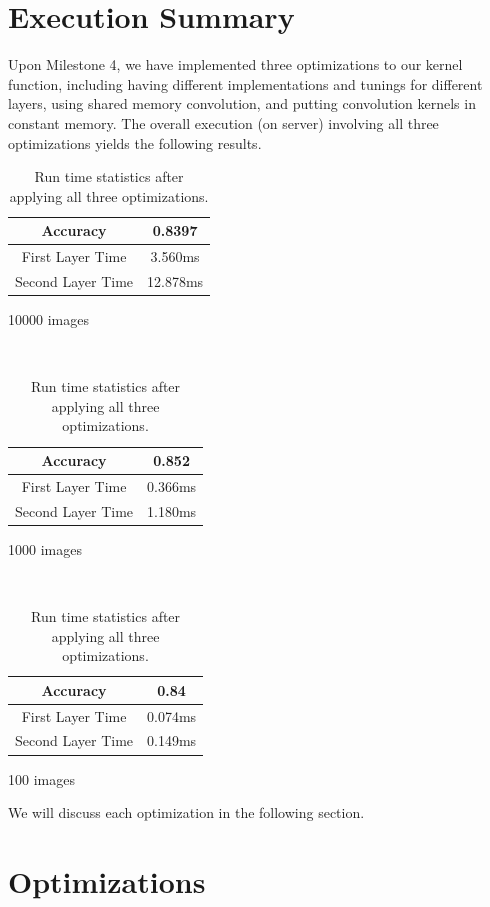 \documentclass{article}
\begin{document}
\section{Execution Summary}
Upon Milestone 4, we have implemented three optimizations to our kernel function, including having different
implementations and tunings for different layers, using shared memory convolution, and putting convolution
kernels in constant memory. The overall execution (on server) involving all three optimizations yields the following
results.

\begin{table}[H]
    \centering
    \begin{minipage}{.32\linewidth}
        \begin{tabular}{c|c}
            Accuracy & 0.8397 \\ \hline
            First Layer Time & 3.560ms \\ \hline
            Second Layer Time & 12.878ms
        \end{tabular}
        \caption*{10000 images}
    \end{minipage}
    ~
    \begin{minipage}{.32\linewidth}
        \begin{tabular}{c|c}
            Accuracy & 0.852 \\ \hline
            First Layer Time & 0.366ms \\ \hline
            Second Layer Time & 1.180ms
        \end{tabular}
        \caption*{1000 images}
    \end{minipage}
    ~
    \begin{minipage}{.32\linewidth}
        \begin{tabular}{c|c}
            Accuracy & 0.84 \\ \hline
            First Layer Time & 0.074ms \\ \hline
            Second Layer Time & 0.149ms
        \end{tabular}
        \caption*{100 images}
    \end{minipage}
    \caption{Run time statistics after applying all three optimizations.}
\end{table}

We will discuss each optimization in the following section.

\section{Optimizations}
\end{document}
